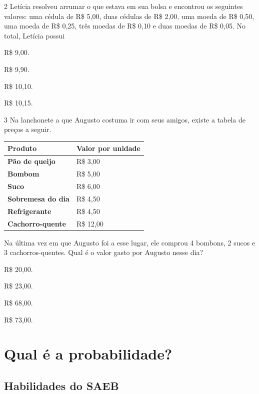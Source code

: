 \num{2} Letícia resolveu arrumar o que estava em sua bolsa e encontrou
os seguintes valores: uma cédula de R\$ 5,00, duas cédulas de R\$ 2,00, uma moeda de R\$ 0,50, uma moeda de R\$ 0,25, três moedas de R\$ 0,10 e duas moedas de R\$ 0,05. No total, Letícia possui

\begin{escolha}
\begin{multicols}{2}
\item
  R\$ 9,00.
\item
  R\$ 9,90.
\item
  R\$ 10,10.
\item
  R\$ 10,15.
\end{multicols}
\end{escolha}

\num{3} Na lanchonete a que Augusto costuma ir com seus amigos, existe a tabela de preços a seguir.

\begin{longtable}[]{@{}ll@{}}
\toprule
\textbf{Produto} & \textbf{Valor por unidade}\tabularnewline
\midrule
\endhead
\textbf{Pão de queijo} & R\$ 3,00\tabularnewline
\textbf{Bombom} & R\$ 5,00\tabularnewline
\textbf{Suco} & R\$ 6,00\tabularnewline
\textbf{Sobremesa do dia} & R\$ 4,50\tabularnewline
\textbf{Refrigerante} & R\$ 4,50\tabularnewline
\textbf{Cachorro-quente} & R\$ 12,00\tabularnewline
\bottomrule
\end{longtable}

Na última vez em que Augusto foi a esse lugar, ele comprou 4 bombons, 2
sucos e 3 cachorros-quentes. Qual é o valor gasto por Augusto nesse dia?

\begin{escolha}
\begin{multicols}{2}
\item
  R\$ 20,00.
\item
  R\$ 23,00.
\item
  R\$ 68,00.
\item
  R\$ 73,00.
\end{multicols}
\end{escolha}


\chapter{Qual é a probabilidade?}

\section*{Habilidades do SAEB}

